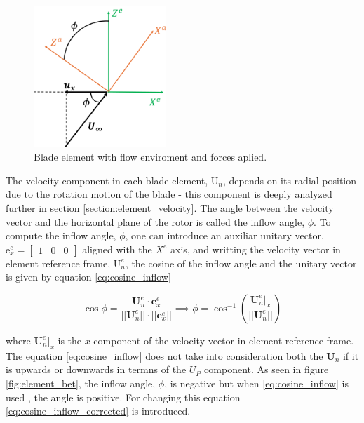 \begin{figure}[!htb]
    \centering
    \includegraphics[width=5cm]{Figures/background/bet/phi_angle.png}
    \caption{Blade element with flow enviroment and forces aplied.}
    \label{fig:phi_angle}
\end{figure}



The velocity component in each blade element, $\mathrm{U}_n$, depends on its radial position due to the rotation motion of the blade - this component is deeply analyzed further in section \ref{section:element_velocity}. The angle between the velocity vector and the horizontal plane of the rotor is called the inflow angle, $\phi$. To compute the inflow angle, $\phi$, one can introduce an auxiliar unitary vector, $\mathrm{e}^e_x = \begin{bmatrix} 1 & 0 & 0 \end{bmatrix}$ aligned with the $X^e$ axis, and writting the velocity vector in element reference frame, $\mathrm{U}_n^e$, the cosine of the inflow angle and the unitary vector is given by equation \ref{eq:cosine_inflow}



\begin{equation}
    \cos \phi = \frac{\mathbf{U}_n^e \cdot \mathbf{e}^e_x}{||\mathbf{U}_n^e|| \cdot ||\mathbf{e}_x^e||} \implies \phi = \cos^{-1} \left( \frac{\mathbf{U}_n^e|_x}{||\mathbf{U}_n^e||}\right)
    \label{eq:cosine_inflow}
\end{equation}

where $\mathbf{U}_n^e|_x$ is the $x$-component of the velocity vector in element reference frame. The equation \ref{eq:cosine_inflow} does not take into consideration both the $\mathbf{U}_n$ if it is upwards or downwards in termns of the $U_P$ component. As seen in figure \ref{fig:element_bet}, the inflow angle, $\phi$, is negative but when \ref{eq:cosine_inflow} is used , the angle is positive. For changing this equation \ref{eq:cosine_inflow_corrected} is introduced.

